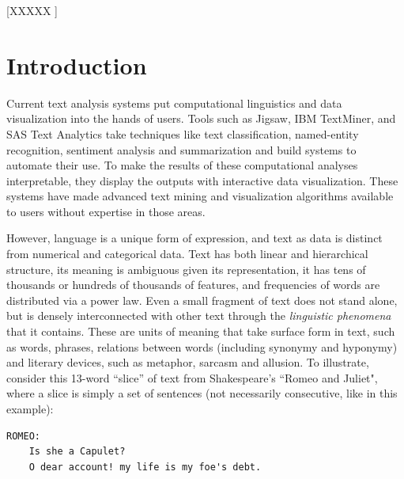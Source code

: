 \documentclass{sig-alternate}
\begin{document}

[XXXXX ]


\section{Introduction}
Current text analysis systems put computational linguistics and data visualization into the hands of users. Tools such as Jigsaw, IBM TextMiner, and SAS Text Analytics take techniques like text classification, named-entity recognition, sentiment analysis and summarization and build systems to automate their use. To make the results of these computational analyses interpretable, they display the outputs with interactive data visualization. These systems have made advanced text mining and visualization algorithms available to users without expertise in those areas.

However, language is a unique form of expression, and text as data is distinct from numerical and categorical data.  Text has both linear and hierarchical structure, its meaning is ambiguous given its representation, it has tens of thousands or hundreds of thousands of features, and frequencies of words are distributed via a power law.  
 Even a small fragment of text does not stand alone, but is densely interconnected with other text through the \emph{linguistic phenomena} that it contains. These are units of meaning that take surface form in text, such as words, phrases, relations between words (including synonymy and hyponymy) and literary devices, such as metaphor, sarcasm and allusion. To illustrate, consider this 13-word ``slice'' of text from Shakespeare's ``Romeo and Juliet", where a slice is simply a set of sentences (not necessarily consecutive, like in this example):

\begin{verbatim}
ROMEO:
    Is she a Capulet?
    O dear account! my life is my foe's debt.
\end{verbatim}
\end{document}
